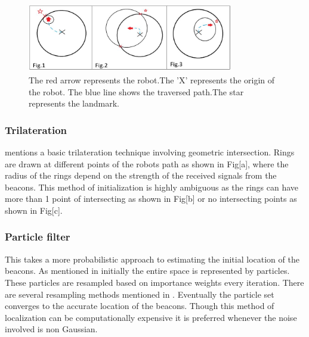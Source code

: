 \documentclass[conference]{IEEEtran}
\begin{document}
		\begin{figure}
			\centering
			\includegraphics[height=30mm,width=90mm]{Trilateration_methods.JPG}
			\caption{The red arrow represents the robot.The 'X' represents the origin of the robot. The blue line shows the traversed path.The star represents the landmark. }
		\end{figure}
	
	\subsubsection{Trilateration}
		\cite{Thrun2002} mentions a basic trilateration technique involving geometric intersection. Rings are drawn at different points of the robots path as shown in Fig[a], where the radius of the rings depend on the strength of the received signals from the beacons. This method of initialization is highly ambiguous as the rings can have more than 1 point of intersecting as shown in Fig[b]  or no  intersecting points as shown in Fig[c]. %

	\subsubsection{Particle filter}
		This takes a more probabilistic approach to estimating the initial location of the beacons. As mentioned in\cite{Thrun2002a} initially the entire space is represented by particles. These particles are resampled based on importance weights every iteration. There are several resampling methods mentioned in \cite{Li2015}. Eventually the particle set converges to the accurate location of the beacons. Though this method of localization can be computationally expensive it is preferred whenever the noise involved is non Gaussian.
\end{document}
